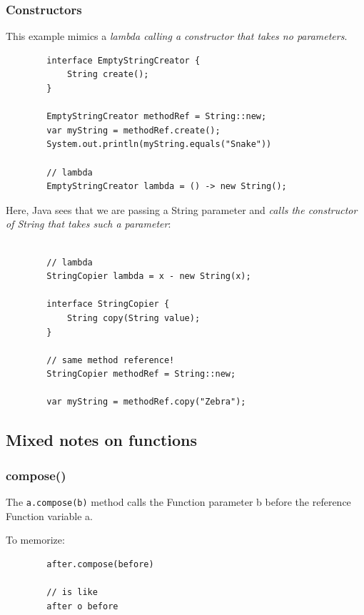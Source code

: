 \documentclass{scrartcl}
\begin{document}
    \subsubsection{Constructors}

    This example mimics a \textit{lambda calling a constructor that takes no parameters}.

    \begin{lstlisting}
        interface EmptyStringCreator {
            String create();
        }

        EmptyStringCreator methodRef = String::new;
        var myString = methodRef.create();
        System.out.println(myString.equals("Snake"))

        // lambda
        EmptyStringCreator lambda = () -> new String();

    \end{lstlisting}

    Here, Java sees that we are passing a String parameter and \textit{calls the constructor of String that takes such a parameter}:

    \begin{lstlisting}

        // lambda
        StringCopier lambda = x - new String(x);

        interface StringCopier {
            String copy(String value);
        }

        // same method reference!
        StringCopier methodRef = String::new;

        var myString = methodRef.copy("Zebra");

    \end{lstlisting}

\subsection{Mixed notes on functions}
\subsubsection{compose()}

    The \lstinline{a.compose(b)} method calls the Function parameter b before the reference Function variable a.

    To memorize:

    \begin{lstlisting}
        after.compose(before)

        // is like
        after o before

    \end{lstlisting}
\end{document}
